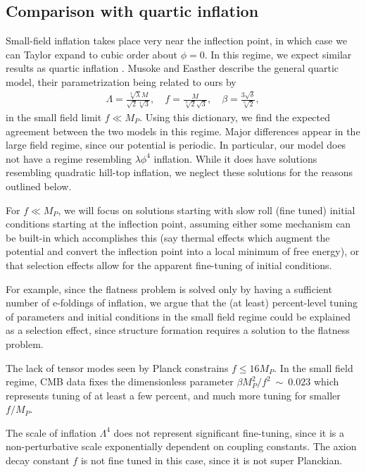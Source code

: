 \documentclass[aps,amsfonts,amsmath,prd,preprint,nofootinbib,superscriptaddress]{revtex4}
\newcommand{\Mp}{{M_{P}}}
\newcommand{\MMp}{{M_P^2}}
\begin{document}
\subsection{Comparison with quartic inflation}
Small-field inflation takes place very near the inflection point, in which case we can Taylor expand to cubic order about $\phi=0$. 
In this regime, we expect similar results as quartic inflation \cite{quartic}.  Musoke and Easther \cite{Musoke:2017frr} describe the general quartic model, their parametrization being related to ours by
\begin{align}
\Lambda = \frac{\sqrt[4]{\lambda } M}{\sqrt{2} \sqrt[4]{3}}, \quad f = \frac{M}{\sqrt[3]{2} \sqrt{3}}, \quad \beta = \frac{3 \sqrt{\delta}}{\sqrt[6]{2}},
\end{align}
in the small field limit $f \ll \Mp$.  Using this dictionary, we find the expected agreement between the two models in this regime.
Major differences appear in the large field regime, since our potential is periodic.  In particular, our model does not have a regime resembling $\lambda \phi^4$ inflation.  While it does
have solutions resembling quadratic hill-top inflation, we neglect these solutions for the reasons outlined below.

For $f \ll \Mp$, we will focus on solutions starting with slow roll (fine tuned) initial conditions starting at the inflection point, assuming either some mechanism can be built-in which accomplishes
this (say thermal effects which augment the potential and convert the inflection point into a local minimum of free energy), or that selection effects allow for the apparent fine-tuning of
initial conditions.

For example, since the flatness problem is solved only by having a sufficient number of e-foldings of inflation, we argue that the (at least) percent-level tuning of parameters and initial conditions in
the small field regime could be explained as a selection effect, since structure formation requires a solution to the flatness problem.


The lack of tensor modes seen by Planck \cite{} constrains $f \leq 16\Mp$.  
In the small field regime, CMB data fixes the dimensionless parameter $\beta \MMp/f^2~\sim~0.023$ which represents tuning of at least a few percent, and much more tuning for smaller $f/\Mp$.  

The scale of inflation $\Lambda^4$ does not represent significant fine-tuning, since it is a non-perturbative scale exponentially dependent on coupling constants.  
The axion decay constant $f$ is not fine tuned in this case, since it is not super Planckian.
\end{document}
